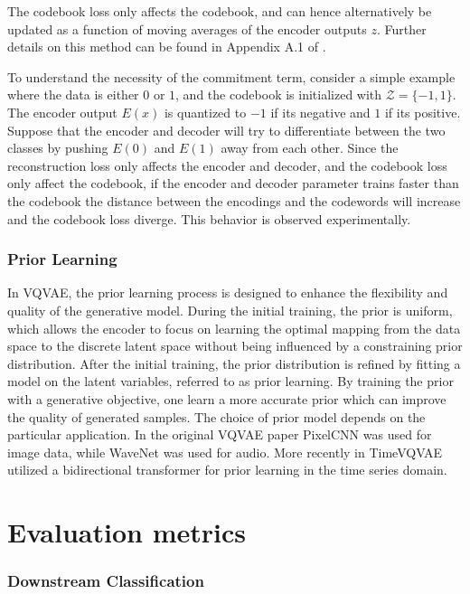 \documentclass[../../thesis.tex]{subfiles}
\begin{document}
The codebook loss only affects the codebook, and can hence alternatively be updated as a function of moving averages of the encoder outputs $z$. Further details on this method can be found in Appendix A.1 of \cite{VQVAE}.\newline 

To understand the necessity of the commitment term, consider a simple example where the data is either $0$ or $1$, and the codebook is initialized with $\mathcal{Z} = \{-1,1\}$. The encoder output $E(x)$ is quantized to $-1$ if its negative and $1$ if its positive. Suppose that the encoder and decoder will try to differentiate between the two classes by pushing $E(0)$ and $E(1)$ away from each other. Since the reconstruction loss only affects the encoder and decoder, and the codebook loss only affect the codebook, if the encoder and decoder parameter trains faster than the codebook the distance between the encodings and the codewords will increase and the codebook loss diverge. This behavior is observed experimentally.

\subsubsection{Prior Learning}
In VQVAE, the prior learning process is designed to enhance the flexibility and quality of the generative model. During the initial training, the prior is uniform, which allows the encoder to focus on learning the optimal mapping from the data space to the discrete latent space without being influenced by a constraining prior distribution. After the initial training, the prior distribution is refined by fitting a model on the latent variables, referred to as prior learning. By training the prior with a generative objective, one learn a more accurate prior which can improve the quality of generated samples. The choice of prior model depends on the particular application. In the original VQVAE paper PixelCNN \cite{oord2016pixel} was used for image data, while WaveNet \cite{oord2016wavenet} was used for audio. More recently in TimeVQVAE \cite{TimeVQVAE} utilized a bidirectional transformer \cite{chang2022maskgit} for prior learning in the time series domain. 

\section{Evaluation metrics}

\subsubsection{Downstream Classification}
\end{document}
